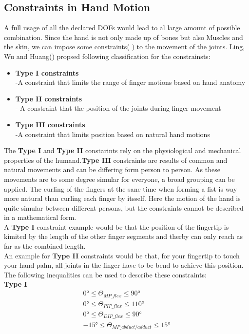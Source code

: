 \subsection{Constraints in Hand Motion}
A full usage of all the declared DOFs would lead to al large amount of possible combination. Since the hand is not only made up of bones but also Muscles and the skin, we can impose some constraints( \cite{Badler.1987}) to the movement of the joints. Ling, Wu and Huang(\cite{LIN.2000}) propsed following classification for the constrainsts:
\begin{itemize}
\item \textbf{Type I constraints}\\
	-A constraint that limits the range of finger motions based on hand anatomy
	\item \textbf{Type II constraints}\\
	- A constraint that the position of the joints during finger movement
	\item \textbf{Type III constraints\\}
	-A constraint that limits position based on natural hand motions
\end{itemize} 
The \textbf{Type I} and \textbf{Type II} constarints rely on the physiological and mechanical properties of the humand.\textbf{Type III} constraints are results of common and natural
movements and can be differing form person to person. As these movements are to some degree simular for everyone, a broad grouping can be applied. The curling of the fingers at the sane time when forming a fist is way more natural than curling each finger by itsself. Here the motion of the hand is quite simular between different persons, but the constraints cannot be described in a mathematical form. \\
 A \textbf{Type I} constraint example would be that the position of the fingertip is kimited by the length of the other finger segments and therby can only reach as far as the combined length.\\An example for \textbf{Type II} constraints would be that, for your fingertip to touch your hand palm, all joints in the finger have to be bend to achieve this position.
The following inequalities can be used to describe these constraints:\\
\textbf{Type I}
\begin{equation}
\begin{split}
0°\leq \Theta _{MP\_flex} \leq 90°\\
0°\leq \Theta _{PIP\_flex} \leq 110°\\
0°\leq \Theta _{DIP\_flex} \leq 90°\\
-15°\leq \Theta _{MP\_abduct/adduct} \leq 15°
\end{split}
\end{equation}
